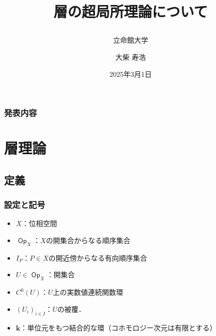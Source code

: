 \documentclass[dvipdfmx,10pt,aspectratio=169,leqno]{beamer}%
\title{層の超局所理論について
\subtitle{立命館大学}}
\date{2025年3月1日}
\author{大柴 寿浩}
\institute[NITech]
{
北海道大学大学院理学院数学専攻
}
\newcommand{\kk}{\mathbf{k}}
\numberwithin{equation}{subsection}
\newcommand{\Op}{\mathop{\textsf{Op}}\nolimits}
\theoremstyle{mystyle}
\begin{document}
\begin{frame}
    \titlepage
\end{frame}

\begin{frame}
    \frametitle{発表内容}
    \tableofcontents
\end{frame}

\section[層]{層理論}
\subsection{定義}

\begin{frame}
    \frametitle{設定と記号}
    \begin{itemize}
        \item \(X\)：位相空間
        \item \(\Op_X\)：\(X\)の開集合からなる順序集合
        \item \(I_P\)：\(P\in X\)の開近傍からなる有向順序集合
        \item \(U\in \Op_{X}\)：開集合
        \item \(C^0(U)\)：\(U\)上の実数値連続関数環
        \item \((U_i)_{i\in I}\)：\(U\)の被覆．
        \item \(\kk\)：単位元をもつ結合的な環（コホモロジー次元は有限とする）
    \end{itemize}
\end{frame}
\end{document}
